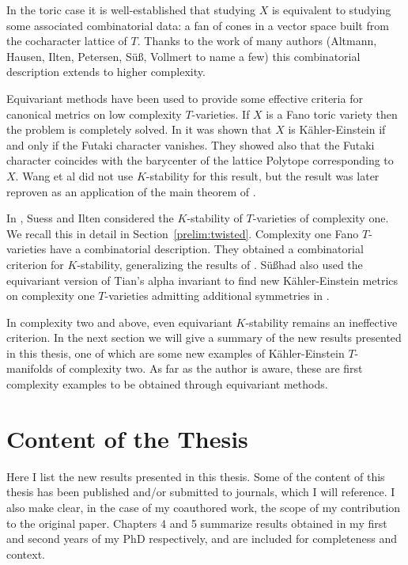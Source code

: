 In the toric case it is well-established that studying \(X\) is equivalent to studying some associated combinatorial data: a fan of cones in a vector space built from the cocharacter lattice of \(T\). Thanks to the work of many authors (Altmann, Hausen, Ilten, Petersen, S\"u\ss, Vollmert to name a few) this combinatorial description extends to higher complexity.

Equivariant methods have been used to provide some effective criteria for canonical metrics on low complexity \(T\)-varieties. If \(X\) is a Fano toric variety then the problem is completely solved. In \cite{wang2004} it was shown that \(X\) is K\"ahler-Einstein if and only if the Futaki character vanishes. They showed also that the Futaki character coincides with the barycenter of the lattice Polytope corresponding to \(X\). Wang et al did not use \(K\)-stability for this result, but the result was later reproven as an application of the main theorem of \cite{datar2016kahler}.

In \cite{ilten2015}, Suess and Ilten considered the \(K\)-stability of \(T\)-varieties of complexity one. We recall this in detail in Section~\ref{prelim:twisted}. Complexity one Fano \(T\)-varieties have a combinatorial description. They obtained a combinatorial criterion for \(K\)-stability, generalizing the results of \cite{wang2004}. S\"u\ss had also used the equivariant version of Tian's alpha invariant to find new K\"ahler-Einstein metrics on complexity one \(T\)-varieties admitting additional symmetries in \cite{suss2013kahler}.

In complexity two and above, even equivariant \(K\)-stability remains an ineffective criterion. In the next section we will give a summary of the new results presented in this thesis, one of which are some new examples of K\"ahler-Einstein \(T\)-manifolds of complexity two. As far as the author is aware, these are first complexity examples to be obtained through equivariant methods.

\section{Content of the Thesis} \label{content}
Here I list the new results presented in this thesis. Some of the content of this thesis has been published and/or submitted to journals, which I will reference. I also make clear, in the case of my coauthored work, the scope of my contribution to the original paper. Chapters 4 and 5 summarize results obtained in my first and second years of my PhD respectively, and are included for completeness and context.
